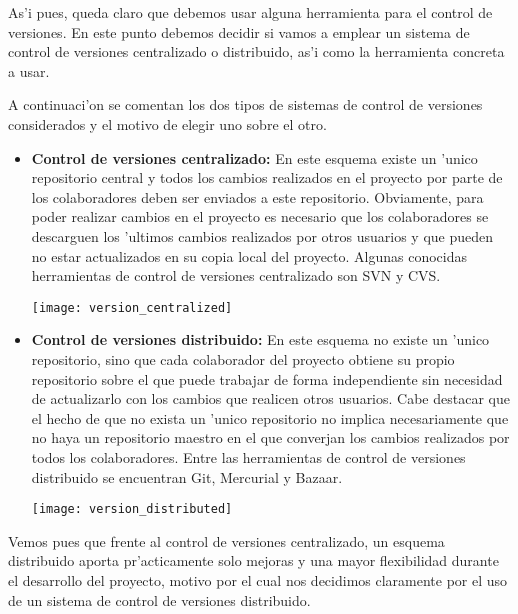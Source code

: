 As'i pues, queda claro que debemos usar alguna herramienta para el control de versiones. En este punto debemos
decidir si vamos a emplear un sistema de control de versiones centralizado o distribuido, as'i como la herramienta
concreta a usar.

A continuaci'on se comentan los dos tipos de sistemas de control de versiones\cite{versioncontrol} considerados y el
motivo de elegir uno sobre el otro.

\begin{itemize}
\item \textbf{Control de versiones centralizado:} En este esquema existe un 'unico repositorio central y todos los
cambios realizados en el proyecto por parte de los colaboradores deben ser enviados a este repositorio. Obviamente,
para poder realizar cambios en el proyecto es necesario que los colaboradores se descarguen los 'ultimos cambios
realizados por otros usuarios y que pueden no estar actualizados en su copia local del proyecto.
Algunas conocidas herramientas de control de versiones centralizado son SVN y CVS.

\begin{center}
\texttt{[image: version\_centralized]}
\end{center}

\item \textbf{Control de versiones distribuido:} En este esquema no existe un 'unico repositorio, sino que cada
colaborador del proyecto obtiene su propio repositorio sobre el que puede trabajar de forma independiente sin
necesidad de actualizarlo con los cambios que realicen otros usuarios. Cabe destacar que el hecho de que no exista
un 'unico repositorio no implica necesariamente que no haya un repositorio maestro en el que converjan los cambios
realizados por todos los colaboradores.
Entre las herramientas de control de versiones distribuido se encuentran Git, Mercurial y Bazaar.

\begin{center}
\texttt{[image: version\_distributed]}
\end{center}

\end{itemize}

Vemos pues que frente al control de versiones centralizado, un esquema distribuido aporta pr'acticamente solo mejoras
y una mayor flexibilidad durante el desarrollo del proyecto, motivo por el cual nos decidimos claramente por el uso
de un sistema de control de versiones distribuido.

